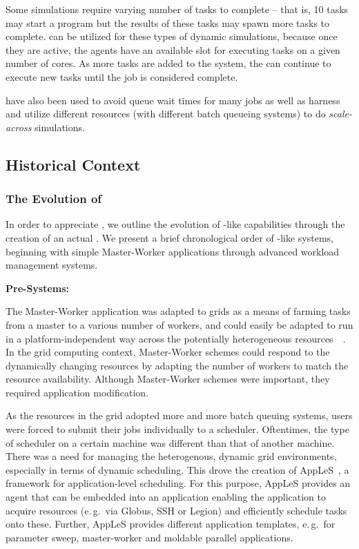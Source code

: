 \documentclass{sig-alternate}
\begin{document}
Some simulations require varying number of tasks to complete -- that
is, 10 tasks may start a program but the results of these tasks may
spawn more tasks to complete. \pilotjobs can be utilized for these
types of dynamic simulations, because once they are active, the agents
have an available slot for executing tasks on a given number of
cores. As more tasks are added to the system, the \pilot can continue
to execute new tasks until the job is considered
complete. %

\pilotjobs have also been used to avoid queue wait times for many jobs
as well as harness and utilize different resources (with different
batch queueing systems) to do \textit{scale-across} simulations.



\subsection{Historical Context}
\subsubsection*{The Evolution of \pilotjobs}

In order to appreciate \pilotjobs, we outline the evolution of
\pilot-like capabilities through the creation of an actual
\pilotjob. We present a brief chronological order of \pilotjob-like
systems, beginning with simple Master-Worker applications through
advanced workload management systems.

\textbf{Pre-\pilotjob Systems:}

The Master-Worker application was adapted to grids as a means of farming tasks from a master to a various number of workers, and could easily be adapted to run in a platform-independent way across the potentially heterogeneous resources~\cite{masterworker}~\cite{Goux00anenabling}. In the grid computing context, Master-Worker schemes could respond to the dynamically changing resources by adapting the number of workers to match the resource availability. Although Master-Worker schemes were important, they required application modification.

As the resources in the grid adopted more and more batch queuing systems, users were forced to submit their jobs individually to a scheduler. Oftentimes, the type of scheduler on a certain machine was different than that of another machine. There was a need for managing the heterogenous, dynamic grid environments, especially in terms of dynamic scheduling. This drove the creation of AppLeS~\cite{Berman:2003:ACG:766629.766632}, a framework for 
application-level scheduling. For this purpose, AppLeS provides an agent that 
can be embedded into an application enabling the application to acquire 
resources (e.\,g.\ via Globus, SSH or Legion) and efficiently schedule tasks 
onto these. Further, AppLeS provides different application templates,
e.\,g.\ for parameter sweep, master-worker and moldable parallel applications.
\end{document}
